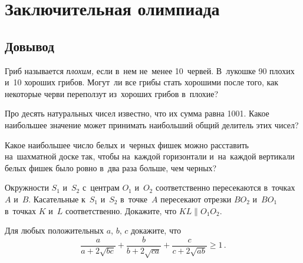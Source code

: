 
\section*{Заключительная олимпиада}

\subsection*{Довывод}

\begin{problems}

\item
Гриб называется \emph{плохим,} если в~нем не~менее 10~червей.
В~лукошке 90 плохих и~10 хороших грибов.
Могут~ли все грибы стать хорошими после того, как некоторые черви переползут
из~хороших грибов в~плохие?

\item
Про десять натуральных чисел известно, что их сумма равна 1001.
Какое наибольшее значение может принимать наибольший общий делитель этих чисел?

\item
Какое наибольшее число белых и~черных фишек можно расставить на~шахматной доске
так, чтобы на~каждой горизонтали и~на~каждой вертикали белых фишек было ровно
в~два раза больше, чем черных?

\item
Окружности $S_1$ и~$S_2$ с~центрам $O_1$ и~$O_2$ соответственно пересекаются
в~точках $A$ и~$B$.
Касательные к~$S_1$ и~$S_2$ в~точке~$A$ пересекают отрезки $B O_2$ и~$B O_1$
в~точках $K$ и~$L$ соответственно.
Докажите, что $KL \parallel O_1 O_2$.

\item
Для любых положительных $a$, $b$, $c$ докажите, что
\[
    \frac{a}{a + 2 \sqrt{bc}} +
    \frac{b}{b + 2 \sqrt{ca}} +
    \frac{c}{c + 2 \sqrt{ab}}
\geq
    1
\, . \]

\end{problems}

